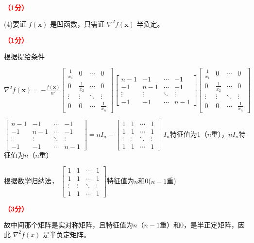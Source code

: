 \documentclass[12pt,a4paper,openany,twoside]{ctexbook}
\begin{document}
\begin{Solution}
		\hfill \textcolor{red}{\textbf{（1分）}}

(4)要证 $f(\mathbf{x})$ 是凹函数，只需证 $\nabla^2  f(\mathbf{x})$ 半负定。

\hfill \textcolor{red}{\textbf{（1分）}}

根据提给条件


$\nabla^2  f(\mathbf{x}) = -\frac{ f(\mathbf{x})}{n^2}\begin{bmatrix}
	\frac{1}{x_1} & 0 & \cdots & 0 \\
	0 & \frac{1}{x_2} & \cdots & 0 \\
	\vdots & \vdots & \ddots & \vdots \\
	0 & 0 & \cdots & \frac{1}{x_n}
	\end{bmatrix}
	\begin{bmatrix}
	n-1 & -1 & \cdots & -1 \\
	-1 & n-1 & \cdots & -1 \\
	\vdots & \vdots & \ddots & \vdots \\
	-1 & -1 & \cdots & n-1
	\end{bmatrix}
	\begin{bmatrix}
	\frac{1}{x_1} & 0 & \cdots & 0 \\
	0 & \frac{1}{x_2} & \cdots & 0 \\
	\vdots & \vdots & \ddots & \vdots \\
	0 & 0 & \cdots & \frac{1}{x_n}
	\end{bmatrix}$


	$\begin{bmatrix}
		n-1 & -1 & \cdots & -1 \\
		-1 & n-1 & \cdots & -1 \\
		\vdots & \vdots & \ddots & \vdots \\
		-1 & -1 & \cdots & n-1
		\end{bmatrix}=nI_n-\begin{bmatrix}
		1 & 1 & \cdots & 1 \\
		1 & 1 & \cdots & 1 \\
		\vdots & \vdots & \ddots & \vdots \\
		1 & 1 & \cdots & 1
		\end{bmatrix}$
$I_n$特征值为1（$n$重），$nI_n$特征值为$n$（$n$重）

根据数学归纳法，
$\begin{bmatrix}
1 & 1 & \cdots & 1 \\
1 & 1 & \cdots & 1 \\
\vdots & \vdots & \ddots & \vdots \\
1 & 1 & \cdots & 1
\end{bmatrix}$特征值为$n$和0($n-1$重)

\hfill \textcolor{red}{\textbf{（3分）}}

故中间那个矩阵是实对称矩阵，且特征值为$n$（$n-1$重）和0，是半正定矩阵，因此 $\nabla^2 f(x)$ 是半负定矩阵。
	

\end{Solution}
\end{document}
